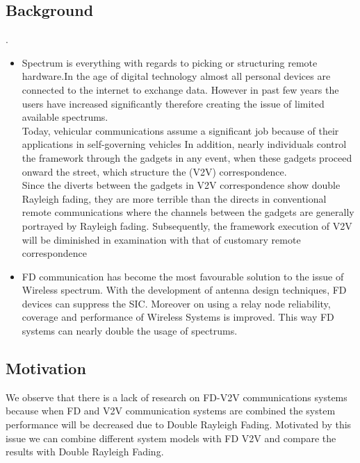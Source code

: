 \documentclass{article}
\begin{document}
\subsection{Background}
.
\begin{itemize}
    \item Spectrum is everything with regards to picking or structuring remote hardware.In the age of digital technology almost all personal devices are connected to the internet to exchange data. However in past few years the users have increased significantly therefore creating the issue of limited available spectrums. 
    \\Today, vehicular communications assume a significant job because of their applications in self-governing vehicles In addition, nearly individuals control the framework through the  gadgets in any event, when these gadgets proceed onward the street, which structure the  (V2V) correspondence.
    \\Since the diverts between the gadgets in V2V correspondence show double Rayleigh fading, they are more terrible than the directs in conventional remote communications where the channels between the gadgets are generally portrayed by Rayleigh fading. Subsequently, the framework execution of V2V will be diminished in examination with that of customary remote correspondence
    
    \item FD communication has become the most favourable solution to the issue of Wireless spectrum. With the development of antenna design techniques, FD devices can suppress the SIC. Moreover on using a relay node reliability, coverage and performance of Wireless Systems is improved. This way FD systems can nearly double the usage of spectrums.
    
    
      
\end{itemize}

\subsection{Motivation}
We observe that there is a lack of research on FD-V2V communications systems because when FD and V2V communication systems are combined the system performance will be decreased due to Double Rayleigh Fading. Motivated by this issue we can combine different system models with FD V2V and compare the results with Double Rayleigh Fading.
\end{document}
